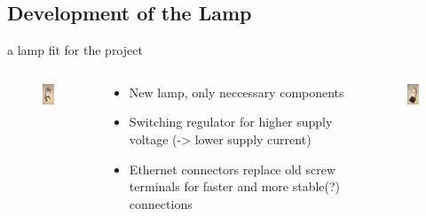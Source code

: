 \documentclass{beamer}
\begin{document}
 \subsection{Development of the Lamp}
  \begin{frame}{a lamp fit for the project}
    \begin{columns}
      \begin{column}{3.5cm}
        \begin{figure}
          \begin{center}
          \includegraphics[width=3cm]{bilder/lampe1.JPG}
          \end{center}
        \end{figure}
      \end{column}
      \begin{column}{5cm}
        \begin{itemize}
        \item New lamp, only neccessary components
        \item Switching regulator for higher supply voltage (-> lower supply current)
        \item Ethernet connectors replace old screw terminals for faster and more stable(?) connections
        \end{itemize}
      \end{column}
      \begin{column}{3.5cm}
         \begin{figure}
          \begin{center}
          \includegraphics[width=3cm]{bilder/lampe2.JPG}
          \end{center}
        \end{figure}
     \end{column}
    \end{columns}
  \end{frame}
\end{document}
